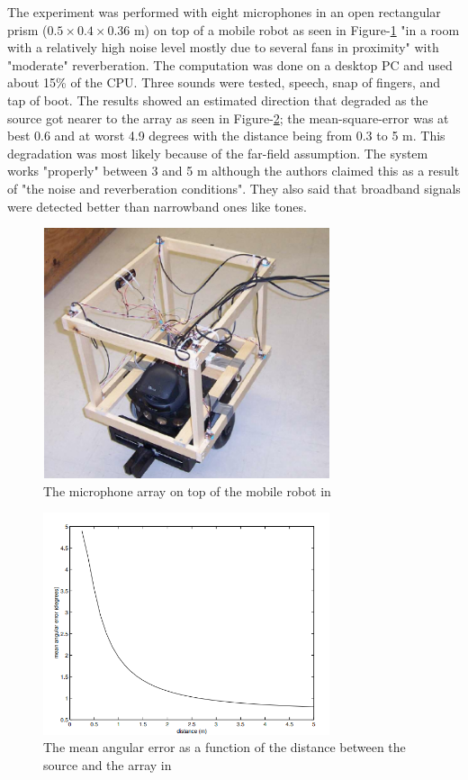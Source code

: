 \documentclass[notitlepage]{report}
\begin{document}
The experiment was performed with eight microphones in an open rectangular prism ($0.5\times 0.4\times 0.36$ \si{m}) on top of a mobile robot as seen in Figure-\ref{fig:valin_2003_robot} "in a room with a relatively high noise level mostly due to several fans in proximity" with "moderate" reverberation. The computation was done on a desktop PC and used about 15\% of the CPU. Three sounds were tested, speech, snap of fingers, and tap of boot. The results showed an estimated direction that degraded as the source got nearer to the array as seen in Figure-\ref{fig:valin_2003_plot}; the mean-square-error was at best 0.6 and at worst 4.9 degrees with the distance being from 0.3 to 5 \si{m}. This degradation was most likely because of the far-field assumption. The system works "properly" between 3 and 5 \si{m} although the authors claimed this as a result of "the noise and reverberation conditions". They also said that broadband signals were detected better than narrowband ones like tones.

\begin{figure}[H]
\includegraphics[width=0.75\textwidth]{./valin_2003/robot.png}
\centering
\caption{The microphone array on top of the mobile robot in \cite{valin_robust_2003}}
\label{fig:valin_2003_robot}
\centering
\end{figure}

\begin{figure}[H]
\includegraphics[width=0.75\textwidth]{./valin_2003/plot.png}
\centering
\caption{The mean angular error as a function of the distance between the source and the array in \cite{valin_robust_2003}}
\label{fig:valin_2003_plot}
\centering
\end{figure}
\end{document}
